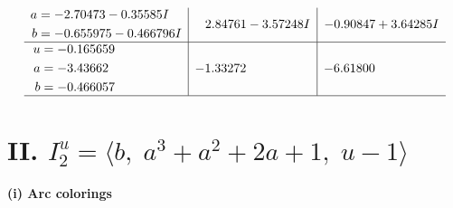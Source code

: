 \documentclass[1p]{elsarticle_modified}
\theoremstyle{definition}
\begin{document}
$$\begin{array}{c|c|c}
\begin{aligned}
a &= -2.70473 - 0.35585 I \\
b &= -0.655975 - 0.466796 I\end{aligned}
 & \phantom{-}2.84761 - 3.57248 I & -0.90847 + 3.64285 I \\ \hline\begin{aligned}
u &= -0.165659\phantom{ +0.000000I} \\
a &= -3.43662\phantom{ +0.000000I} \\
b &= -0.466057\phantom{ +0.000000I}\end{aligned}
 & -1.33272\phantom{ +0.000000I} & -6.61800\phantom{ +0.000000I}\\
 \hline 
 \end{array}$$\newpage\newpage\renewcommand{\arraystretch}{1}
\centering \section*{II. $I^u_{2}= \langle b,\;a^3+a^2+2 a+1,\;u-1 \rangle$}
\flushleft \textbf{(i) Arc colorings}\\
\end{document}

